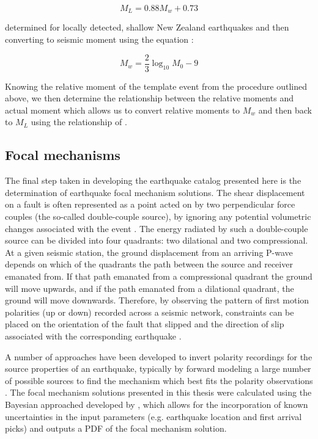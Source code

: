 \begin{equation}
M_{L} = 0.88M_{w} + 0.73
\end{equation}

determined for locally detected, shallow New Zealand earthquakes and then converting to seismic moment using the equation \citep{Hanks_1979}:

\begin{equation}
M_w = \frac{2}{3}\log_{10}M_{0} - 9
\end{equation}

Knowing the relative moment of the template event from the procedure outlined above, we then determine the relationship between the relative moments and actual moment which allows us to convert relative moments to $M_w$ and then back to $M_L$ using the relationship of \citet{Ristau_2009}.

\subsection{Focal mechanisms}
The final step taken in developing the earthquake catalog presented here is the determination of earthquake focal mechanism solutions. The shear displacement on a fault is often represented as a point acted on by two perpendicular force couples (the so-called double-couple source), by ignoring any potential volumetric changes associated with the event \citep{stein_2000}. The energy radiated by such a double-couple source can be divided into four quadrants: two dilational and two compressional. At a given seismic station, the ground displacement from an arriving P-wave depends on which of the quadrants the path between the source and receiver emanated from. If that path emanated from a compressional quadrant the ground will move upwards, and if the path emanated from a dilational quadrant, the ground will move downwards. Therefore, by observing the pattern of first motion polarities (up or down) recorded across a seismic network, constraints can be placed on the orientation of the fault that slipped and the direction of slip associated with the corresponding earthquake \citep{stein_2000}.

A number of approaches have been developed to invert polarity recordings for the source properties of an earthquake, typically by forward modeling a large number of possible sources to find the mechanism which best fits the polarity observations \citep[e.g.][]{Reasenberg_1985,Hardebeck_2002}. The focal mechanism solutions presented in this thesis were calculated using the Bayesian approached developed by \citet{Walsh_2009}, which allows for the incorporation of known uncertainties in the input parameters (e.g. earthquake location and first arrival picks) and outputs a PDF of the focal mechanism solution.

